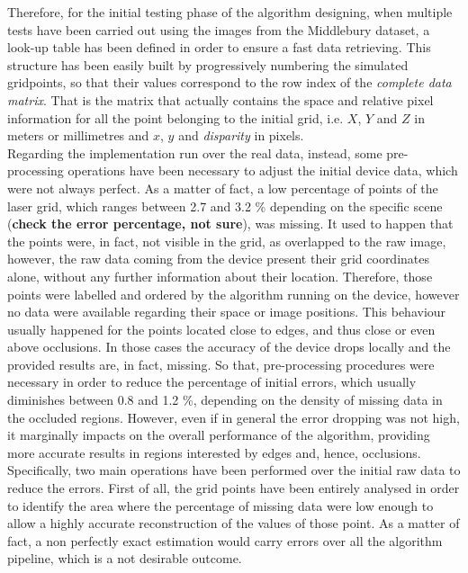 Therefore, for the initial testing phase of the algorithm designing, when multiple tests have been carried out using the images from the Middlebury dataset, a look-up table has been defined in order to ensure a fast data retrieving. 
This structure has been easily built by progressively numbering the simulated gridpoints, so that their values correspond to the row index of the \textit{complete data matrix}.
That is the matrix that actually contains the space and relative pixel information for all the point belonging to the initial grid, i.e. $X$, $Y$ and $Z$ in meters or millimetres and $x$, $y$ and \textit{disparity} in pixels. \\
Regarding the implementation run over the real data, instead, some pre-processing operations have been necessary to adjust the initial device data, which were not always perfect. 
As a matter of fact, a low percentage of points of the laser grid, which ranges between 2.7 and 3.2 \% depending on the specific scene (\textbf{check the error percentage, not sure}), was missing. 
It used to happen that the points were, in fact, not visible in the grid, as overlapped to the raw image, however, the raw data coming from the device present their grid coordinates alone, without any further information about their location.
Therefore, those points were labelled and ordered by the algorithm running on the device, however no data were available regarding their space or image positions.
This behaviour usually happened for the points located close to edges, and thus close or even above occlusions. 
In those cases the accuracy of the device drops locally and the provided results are, in fact, missing. 
So that, pre-processing procedures were necessary in order to reduce the percentage of initial errors, which usually diminishes between 0.8 and 1.2 \%, depending on the density of missing data in the occluded regions.
However, even if in general the error dropping was not high, it marginally impacts on the overall performance of the algorithm, providing more accurate results in regions interested by edges and, hence, occlusions. \\
Specifically, two main operations have been performed over the initial raw data to reduce the errors.
First of all, the grid points have been entirely analysed in order to identify the area where the percentage of missing data were low enough to allow a highly accurate reconstruction of the values of those point.
As a matter of fact, a non perfectly exact estimation would carry errors over all the algorithm pipeline, which is a not desirable outcome. \\
